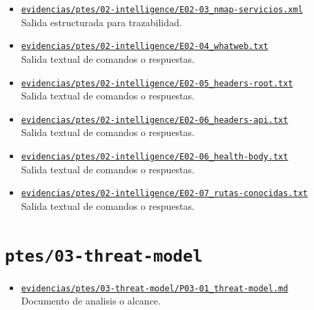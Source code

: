 \begin{itemize}[leftmargin=1.2em]
  {\small Resultado legible de Nmap.}
  \item \href{https://github.com/gamurigm/inventrack-ptes-report/blob/main/evidencias/ptes/02-intelligence/E02-03_nmap-servicios.xml}{\nolinkurl{evidencias/ptes/02-intelligence/E02-03_nmap-servicios.xml}}\\
  {\small Salida estructurada para trazabilidad.}
  \item \href{https://github.com/gamurigm/inventrack-ptes-report/blob/main/evidencias/ptes/02-intelligence/E02-04_whatweb.txt}{\nolinkurl{evidencias/ptes/02-intelligence/E02-04_whatweb.txt}}\\
  {\small Salida textual de comandos o respuestas.}
  \item \href{https://github.com/gamurigm/inventrack-ptes-report/blob/main/evidencias/ptes/02-intelligence/E02-05_headers-root.txt}{\nolinkurl{evidencias/ptes/02-intelligence/E02-05_headers-root.txt}}\\
  {\small Salida textual de comandos o respuestas.}
  \item \href{https://github.com/gamurigm/inventrack-ptes-report/blob/main/evidencias/ptes/02-intelligence/E02-06_headers-api.txt}{\nolinkurl{evidencias/ptes/02-intelligence/E02-06_headers-api.txt}}\\
  {\small Salida textual de comandos o respuestas.}
  \item \href{https://github.com/gamurigm/inventrack-ptes-report/blob/main/evidencias/ptes/02-intelligence/E02-06_health-body.txt}{\nolinkurl{evidencias/ptes/02-intelligence/E02-06_health-body.txt}}\\
  {\small Salida textual de comandos o respuestas.}
  \item \href{https://github.com/gamurigm/inventrack-ptes-report/blob/main/evidencias/ptes/02-intelligence/E02-07_rutas-conocidas.txt}{\nolinkurl{evidencias/ptes/02-intelligence/E02-07_rutas-conocidas.txt}}\\
  {\small Salida textual de comandos o respuestas.}
\end{itemize}

\section{\texorpdfstring{\nolinkurl{ptes/03-threat-model}}{ptes/03-threat-model}}
\begin{itemize}[leftmargin=1.2em]
  \item \href{https://github.com/gamurigm/inventrack-ptes-report/blob/main/evidencias/ptes/03-threat-model/P03-01_threat-model.md}{\nolinkurl{evidencias/ptes/03-threat-model/P03-01_threat-model.md}}\\
  {\small Documento de analisis o alcance.}
\end{itemize}

